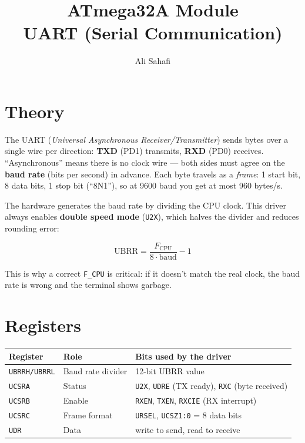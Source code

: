 \documentclass[11pt,a4paper]{article}
\title{ATmega32A Module \\ \Large UART (Serial Communication)}
\author{Ali Sahafi}
\date{}
\begin{document}
\maketitle

\section{Theory}

The UART (\emph{Universal Asynchronous Receiver/Transmitter}) sends bytes
over a single wire per direction: \textbf{TXD} (PD1) transmits,
\textbf{RXD} (PD0) receives. ``Asynchronous'' means there is no clock wire
--- both sides must agree on the \textbf{baud rate} (bits per second) in
advance. Each byte travels as a \emph{frame}: 1 start bit, 8 data bits, 1
stop bit (``8N1''), so at 9600 baud you get at most 960 bytes/s.

The hardware generates the baud rate by dividing the CPU clock. This driver
always enables \textbf{double speed mode} (\texttt{U2X}), which halves the
divider and reduces rounding error:

\begin{equation*}
\text{UBRR} = \frac{F_{\text{CPU}}}{8 \cdot \text{baud}} - 1
\end{equation*}

This is why a correct \texttt{F\_CPU} is critical: if it doesn't match the
real clock, the baud rate is wrong and the terminal shows garbage.

\section{Registers}

\begin{center}
\small
\begin{tabular}{lll}
\toprule
\textbf{Register} & \textbf{Role} & \textbf{Bits used by the driver} \\
\midrule
\texttt{UBRRH/UBRRL} & Baud rate divider & 12-bit UBRR value \\
\texttt{UCSRA} & Status & \texttt{U2X}, \texttt{UDRE} (TX ready), \texttt{RXC} (byte received) \\
\texttt{UCSRB} & Enable & \texttt{RXEN}, \texttt{TXEN}, \texttt{RXCIE} (RX interrupt) \\
\texttt{UCSRC} & Frame format & \texttt{URSEL}, \texttt{UCSZ1:0} = 8 data bits \\
\texttt{UDR}   & Data & write to send, read to receive \\
\bottomrule
\end{tabular}
\end{center}
\end{document}
